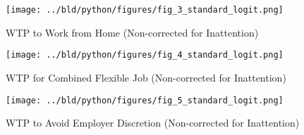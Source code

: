 \documentclass[11pt]{article}
\begin{document}
\begin{figure}[h!]
    \centering
    \texttt{[image: ../bld/python/figures/fig\_3\_standard\_logit.png]}
    \caption{WTP to Work from Home (Non-corrected for Inattention)}
    \label{fig:logistic_regression_8}
    \end{figure}

\begin{figure}[h!]
    \centering
    \texttt{[image: ../bld/python/figures/fig\_4\_standard\_logit.png]}
    \caption{WTP for Combined Flexible Job (Non-corrected for Inattention)}
    \label{fig:logistic_regression_9}
    \end{figure}

\begin{figure}[h!]
    \centering
    \texttt{[image: ../bld/python/figures/fig\_5\_standard\_logit.png]}
    \caption{WTP to Avoid Employer Discretion (Non-corrected for Inattention)}
    \label{fig:logistic_regression_10}
    \end{figure}

\pagebreak



\end{document}
